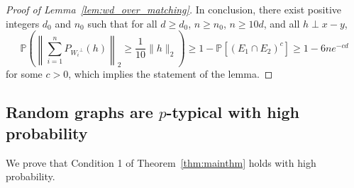 \begin{proof}[Proof of Lemma~\ref{lem:wd_over_matching}]
In conclusion, there exist positive integers $d_0$ and $n_0$ such that for all $d \geq d_0$, $n \geq n_0$, $n \geq 10 d$, and all $h \perp x-y$,
\[
\mathbb{P}\left(\left \| \sum_{i=1}^n P_{{W_i}^\perp} (h) \right\|_2 \geq \frac{1}{10}\|h\|_2 \right) \geq 1- \mathbb{P}\left[(E_1 \cap E_2)^c\right] \geq 1- 6ne^{-cd}
\]
for some $c > 0$, which implies the statement of the lemma. 



\end{proof}




\subsection{Random graphs are $p$-typical with high probability} \label{sec-random-graph}

We prove that Condition 1 of Theorem~\ref{thm:mainthm} holds with high probability.

